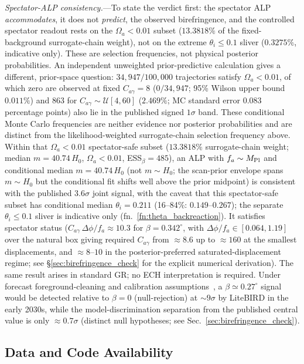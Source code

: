 \documentclass[aps,prd,twocolumn,superscriptaddress,showpacs,preprintnumbers,nofootinbib,longbibliography,floatfix]{revtex4-2}
\newcommand{\MPl}{M_{\rm Pl}}
\begin{document}
\textit{Spectator-ALP consistency.}---To state the verdict first: the
spectator ALP \emph{accommodates}, it does not \emph{predict}, the
observed birefringence, and the controlled spectator readout rests on the
$\Omega_a < 0.01$ subset ($13.3818\%$ of the fixed-background
surrogate-chain weight), not on the extreme $\theta_i\le 0.1$ sliver
($0.3275\%$, indicative only). These are selection frequencies, not physical
posterior probabilities.
An independent unweighted prior-predictive calculation gives a different,
prior-space question: $34{,}947/100{,}000$ trajectories satisfy
$\Omega_a<0.01$, of which zero are observed at fixed $C_{a\gamma}=8$
($0/34{,}947$; 95\% Wilson upper
bound $0.011\%$) and $863$ for $C_{a\gamma}\sim\mathcal U[4,60]$
($2.469\%$; MC standard error $0.083$ percentage points) also lie in the published signed
$1\sigma$ band. These conditional Monte Carlo frequencies are neither
evidence nor posterior probabilities and are distinct from the
likelihood-weighted surrogate-chain selection frequency above.
Within that $\Omega_a < 0.01$ spectator-safe
subset ($13.3818\%$ surrogate-chain weight; median
$m=40.74\,H_0$, $\Omega_a < 0.01$, ESS$_\beta=485$), an ALP with
$f_a\sim\MPl$ and conditional median $m=40.74\,H_0$ (not $m\sim H_0$;
the scan-prior envelope spans $m\sim H_0$ but the conditional fit shifts
well above the prior midpoint)
is consistent with the published $3.6\sigma$ joint signal, with the caveat
that this spectator-safe subset has conditional median $\theta_i=0.211$
(16--84\%: $0.149$--$0.267$); the separate $\theta_i\le0.1$ sliver is
indicative only (fn.~\ref{fn:theta_backreaction}). It satisfies spectator status
($C_{a\gamma}\,\Delta\phi/f_a \approx 10.3$ for $\beta=0.342^\circ$, with
$\Delta\phi/f_a \in [0.064,1.19]$ over the natural box giving required
$C_{a\gamma}$ from ${\approx}8.6$ up to ${\approx}160$ at the smallest
displacements, and ${\approx}8$--$10$ in the posterior-preferred
saturated-displacement regime; see \S\ref{sec:birefringence_check} for the
explicit numerical derivation). The same result arises in standard GR; no ECH
interpretation is required. Under forecast foreground-cleaning
and calibration assumptions~\cite{LiteBIRD2023}, a $\beta\simeq 0.27^\circ$
signal would be detected relative to $\beta=0$ (null-rejection) at ${\sim}9\sigma$
by LiteBIRD in the early 2030s, while the model-discrimination separation from the
published central value is only ${\approx}0.7\sigma$ (distinct null hypotheses;
see Sec.~\ref{sec:birefringence_check}).

\subsection*{Data and Code Availability}
\end{document}

